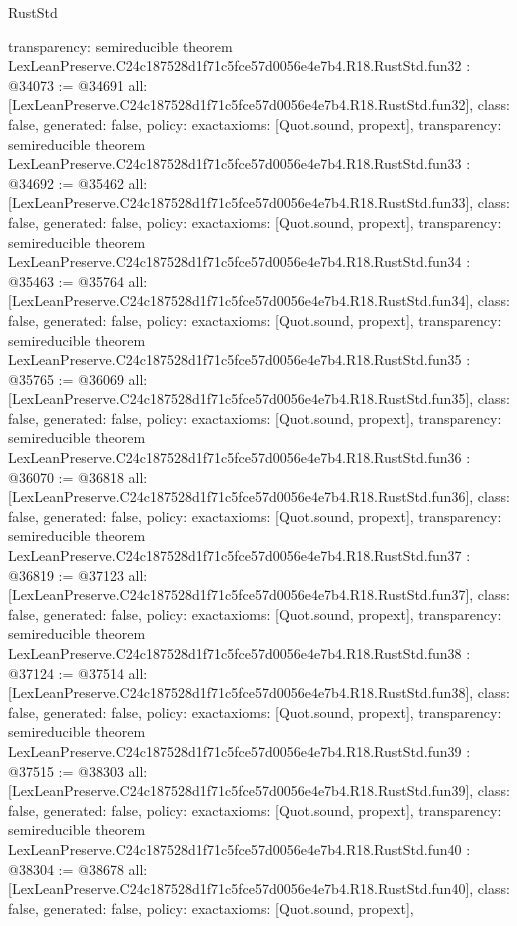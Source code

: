 \begin{lexlean}{RustStd}
\begin{coremodule}
{  transparency: semireducible
}
theorem LexLeanPreserve.C24c187528d1f71c5fce57d0056e4e7b4.R18.RustStd.fun32 : @34073 := @34691 {
  all: [LexLeanPreserve.C24c187528d1f71c5fce57d0056e4e7b4.R18.RustStd.fun32],
  class: false,
  generated: false,
  policy: exact{axioms: [Quot.sound, propext]},
  transparency: semireducible
}
theorem LexLeanPreserve.C24c187528d1f71c5fce57d0056e4e7b4.R18.RustStd.fun33 : @34692 := @35462 {
  all: [LexLeanPreserve.C24c187528d1f71c5fce57d0056e4e7b4.R18.RustStd.fun33],
  class: false,
  generated: false,
  policy: exact{axioms: [Quot.sound, propext]},
  transparency: semireducible
}
theorem LexLeanPreserve.C24c187528d1f71c5fce57d0056e4e7b4.R18.RustStd.fun34 : @35463 := @35764 {
  all: [LexLeanPreserve.C24c187528d1f71c5fce57d0056e4e7b4.R18.RustStd.fun34],
  class: false,
  generated: false,
  policy: exact{axioms: [Quot.sound, propext]},
  transparency: semireducible
}
theorem LexLeanPreserve.C24c187528d1f71c5fce57d0056e4e7b4.R18.RustStd.fun35 : @35765 := @36069 {
  all: [LexLeanPreserve.C24c187528d1f71c5fce57d0056e4e7b4.R18.RustStd.fun35],
  class: false,
  generated: false,
  policy: exact{axioms: [Quot.sound, propext]},
  transparency: semireducible
}
theorem LexLeanPreserve.C24c187528d1f71c5fce57d0056e4e7b4.R18.RustStd.fun36 : @36070 := @36818 {
  all: [LexLeanPreserve.C24c187528d1f71c5fce57d0056e4e7b4.R18.RustStd.fun36],
  class: false,
  generated: false,
  policy: exact{axioms: [Quot.sound, propext]},
  transparency: semireducible
}
theorem LexLeanPreserve.C24c187528d1f71c5fce57d0056e4e7b4.R18.RustStd.fun37 : @36819 := @37123 {
  all: [LexLeanPreserve.C24c187528d1f71c5fce57d0056e4e7b4.R18.RustStd.fun37],
  class: false,
  generated: false,
  policy: exact{axioms: [Quot.sound, propext]},
  transparency: semireducible
}
theorem LexLeanPreserve.C24c187528d1f71c5fce57d0056e4e7b4.R18.RustStd.fun38 : @37124 := @37514 {
  all: [LexLeanPreserve.C24c187528d1f71c5fce57d0056e4e7b4.R18.RustStd.fun38],
  class: false,
  generated: false,
  policy: exact{axioms: [Quot.sound, propext]},
  transparency: semireducible
}
theorem LexLeanPreserve.C24c187528d1f71c5fce57d0056e4e7b4.R18.RustStd.fun39 : @37515 := @38303 {
  all: [LexLeanPreserve.C24c187528d1f71c5fce57d0056e4e7b4.R18.RustStd.fun39],
  class: false,
  generated: false,
  policy: exact{axioms: [Quot.sound, propext]},
  transparency: semireducible
}
theorem LexLeanPreserve.C24c187528d1f71c5fce57d0056e4e7b4.R18.RustStd.fun40 : @38304 := @38678 {
  all: [LexLeanPreserve.C24c187528d1f71c5fce57d0056e4e7b4.R18.RustStd.fun40],
  class: false,
  generated: false,
  policy: exact{axioms: [Quot.sound, propext]},
}
\end{coremodule}
\end{lexlean}
